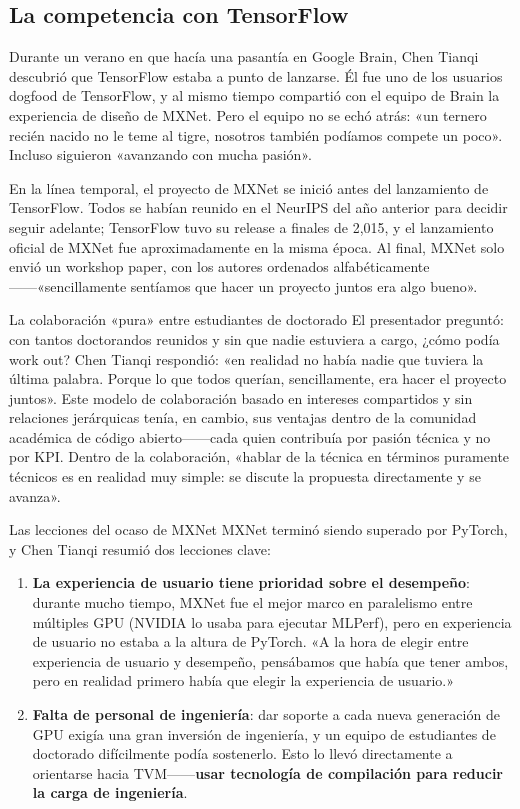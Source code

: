 \documentclass[a4paper]{article}
\begin{document}
\subsection{La competencia con TensorFlow}

Durante un verano en que hacía una pasantía en Google Brain, Chen Tianqi descubrió que TensorFlow estaba a punto de lanzarse. Él fue uno de los usuarios dogfood de TensorFlow, y al mismo tiempo compartió con el equipo de Brain la experiencia de diseño de MXNet. Pero el equipo no se echó atrás: «un ternero recién nacido no le teme al tigre, nosotros también podíamos compete un poco». Incluso siguieron «avanzando con mucha pasión».

En la línea temporal, el proyecto de MXNet se inició antes del lanzamiento de TensorFlow. Todos se habían reunido en el NeurIPS del año anterior para decidir seguir adelante; TensorFlow tuvo su release a finales de 2,015, y el lanzamiento oficial de MXNet fue aproximadamente en la misma época. Al final, MXNet solo envió un workshop paper, con los autores ordenados alfabéticamente------«sencillamente sentíamos que hacer un proyecto juntos era algo bueno».

\begin{knowledgebox}{La colaboración «pura» entre estudiantes de doctorado}
El presentador preguntó: con tantos doctorandos reunidos y sin que nadie estuviera a cargo, ¿cómo podía work out? Chen Tianqi respondió: «en realidad no había nadie que tuviera la última palabra. Porque lo que todos querían, sencillamente, era hacer el proyecto juntos». Este modelo de colaboración basado en intereses compartidos y sin relaciones jerárquicas tenía, en cambio, sus ventajas dentro de la comunidad académica de código abierto------cada quien contribuía por pasión técnica y no por KPI. Dentro de la colaboración, «hablar de la técnica en términos puramente técnicos es en realidad muy simple: se discute la propuesta directamente y se avanza».
\end{knowledgebox}

\begin{warningbox}{Las lecciones del ocaso de MXNet}
MXNet terminó siendo superado por PyTorch, y Chen Tianqi resumió dos lecciones clave:
\begin{enumerate}
    \item \textbf{La experiencia de usuario tiene prioridad sobre el desempeño}: durante mucho tiempo, MXNet fue el mejor marco en paralelismo entre múltiples GPU (NVIDIA lo usaba para ejecutar MLPerf), pero en experiencia de usuario no estaba a la altura de PyTorch. «A la hora de elegir entre experiencia de usuario y desempeño, pensábamos que había que tener ambos, pero en realidad primero había que elegir la experiencia de usuario.»
    \item \textbf{Falta de personal de ingeniería}: dar soporte a cada nueva generación de GPU exigía una gran inversión de ingeniería, y un equipo de estudiantes de doctorado difícilmente podía sostenerlo. Esto lo llevó directamente a orientarse hacia TVM------\textbf{usar tecnología de compilación para reducir la carga de ingeniería}.
\end{enumerate}
\end{warningbox}
\end{document}
